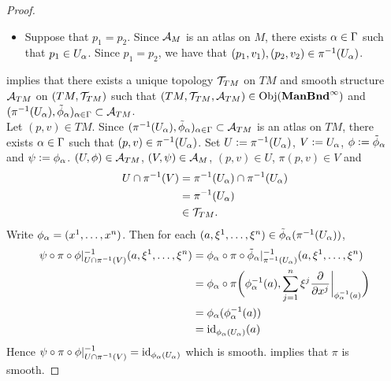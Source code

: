 \documentclass{book}
\begin{document}
\begin{proof}
\begin{enumerate}[label=(\alph*)]
\begin{itemize}
			\begin{align*}
				\pi^{-1}(U_{\al_1}) \cap \pi^{-1}(U_{\al_2})
				& = \pi^{-1}(U_{\al_1} \cap U_{\al_2}) \\
				& = \pi^{-1}(\varnothing) \\
				& = \varnothing.
			\end{align*}
			\item Suppose that $p_1 = p_2$. Since $\mathcal{A}_M$ is an atlas on $M$, there exists $\alpha \in \Gamma$ such that $p_1 \in U_{\alpha}$. Since $p_1 = p_2$, we have that $(p_1, v_1), (p_2, v_2) \in \pi^{-1}(U_{\alpha})$.
		\end{itemize}
	\end{enumerate}
	 implies that there exists a unique topology $\mathcal{T}_{TM}$ on $TM$ and smooth structure $\mathcal{A}_{TM}$ on $(TM, \mathcal{T}_{TM})$ such that $(TM, \mathcal{T}_{TM}, \mathcal{A}_{TM}) \in \operatorname{Obj}(\operatorname*{\text{\textbf{ManBnd}}^{\infty}})$ and $(\pi^{-1}(U_{\alpha}), \tilde{\phi}_{\alpha})_{\alpha \in \Gamma} \subset \mathcal{A}_{TM}$. \vspace{.2cm} \\
	Let $(p,v) \in TM$. Since $(\pi^{-1}(U_{\alpha}), \tilde{\phi}_{\alpha})_{\alpha \in \Gamma} \subset \mathcal{A}_{TM}$ is an atlas on $TM$, there exists $\alpha \in \Gamma$ such that $(p,v) \in \pi^{-1}(U_{\alpha})$. Set $U \vcentcolon= \pi^{-1}(U_{\alpha})$, $V \vcentcolon= U_{\alpha}$, $\phi \vcentcolon= \tilde{\phi}_{\alpha}$ and $\psi \vcentcolon= \phi_{\alpha}$. $(U, \phi) \in \mathcal{A}_{TM}$, $(V, \psi) \in \mathcal{A}_M$, $(p,v) \in U$, $\pi(p,v) \in V$ and 
	\begin{align*}
		U \cap \pi^{-1}(V)
		& = \pi^{-1}(U_{\alpha}) \cap \pi^{-1}(U_{\alpha}) \\
		& = \pi^{-1}(U_{\alpha}) \\
		& \in \mathcal{T}_{TM}.
	\end{align*}
	Write $\phi_{\alpha} = (x^1, \ldots, x^n)$. Then for each $(a, \xi^1, \ldots, \xi^n) \in \tilde{\phi}_{\alpha}(\pi^{-1}(U_{\alpha}))$,
	\begin{align*}
		\psi \circ \pi \circ \phi|_{U \cap \pi^{-1}(V)}^{-1}(a, \xi^1, \ldots, \xi^n)
		& = \phi_{\alpha} \circ \pi \circ \tilde{\phi}_{\alpha}|_{\pi^{-1}(U_{\alpha})}^{-1}(a, \xi^1, \ldots, \xi^n) \\
		& = \phi_{\alpha} \circ \pi \bigg( \phi_{\alpha}^{-1}(a), \sum\limits_{j=1}^n \xi^j \frac{\partial}{\partial x^j} \bigg|_{\phi_{\alpha}^{-1}(a)} \bigg) \\
		& = \phi_{\alpha} (\phi_{\alpha}^{-1}(a)) \\
		& = \operatorname{id}_{\phi_{\alpha}(U_{\alpha})} (a) 
	\end{align*}
	Hence $\psi \circ \pi \circ \phi|_{U \cap \pi^{-1}(V)}^{-1} = \operatorname{id}_{\phi_{\alpha}(U_{\alpha})}$ which is smooth.  implies that $\pi$ is smooth.
\end{proof}
\end{document}

